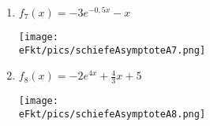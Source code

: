 \begin{Answer}[ref=schAsyA1]
\begin{minipage}{\textwidth}
\begin{minipage}{0.49\textwidth}
\begin{enumerate}[label=\alph*)]
				\item \(f_7(x)=-3e^{-0,5x}-x\)\\\begin{minipage}[t]{0.95\textwidth}
					\texttt{[image: \\eFkt/pics/schiefeAsymptoteA7.png]}
				\end{minipage}
				\item \(f_8(x)=-2e^{4x}+\frac{4}{3}x+5\)\\\begin{minipage}[t]{0.95\textwidth}
					\texttt{[image: \\eFkt/pics/schiefeAsymptoteA8.png]}
				\end{minipage}
			\end{enumerate}
		\end{minipage}
	\end{minipage}
\end{Answer}